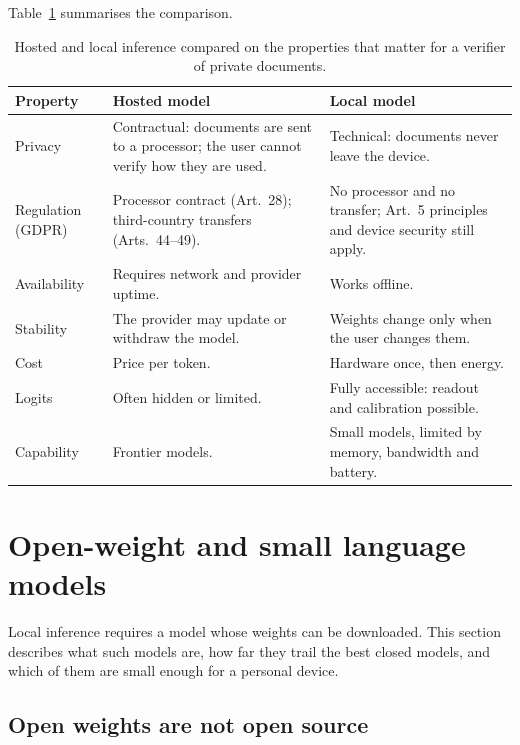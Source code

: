 Table~\ref{tab:local-tradeoff} summarises the comparison.

\begin{table}[htbp]
\centering
\caption{Hosted and local inference compared on the properties that matter for a verifier of private documents.}
\label{tab:local-tradeoff}
\small
\begin{tabularx}{\textwidth}{@{}l>{\raggedright\arraybackslash}X>{\raggedright\arraybackslash}X@{}}
\toprule
Property & Hosted model & Local model \\
\midrule
Privacy & Contractual: documents are sent to a processor; the user cannot verify how they are used. & Technical: documents never leave the device. \\
Regulation (GDPR) & Processor contract (Art.~28); third-country transfers (Arts.~44--49). & No processor and no transfer; Art.~5 principles and device security still apply. \\
Availability & Requires network and provider uptime. & Works offline. \\
Stability & The provider may update or withdraw the model. & Weights change only when the user changes them. \\
Cost & Price per token. & Hardware once, then energy. \\
Logits & Often hidden or limited. & Fully accessible: readout and calibration possible. \\
Capability & Frontier models. & Small models, limited by memory, bandwidth and battery. \\
\bottomrule
\end{tabularx}
\end{table}

\section{Open-weight and small language models}
\label{sec:local-models}

Local inference requires a model whose weights can be downloaded. This section describes what such models are, how far
they trail the best closed models, and which of them are small enough for a personal device.

\subsection{Open weights are not open source}
\label{sec:local-openweight}

